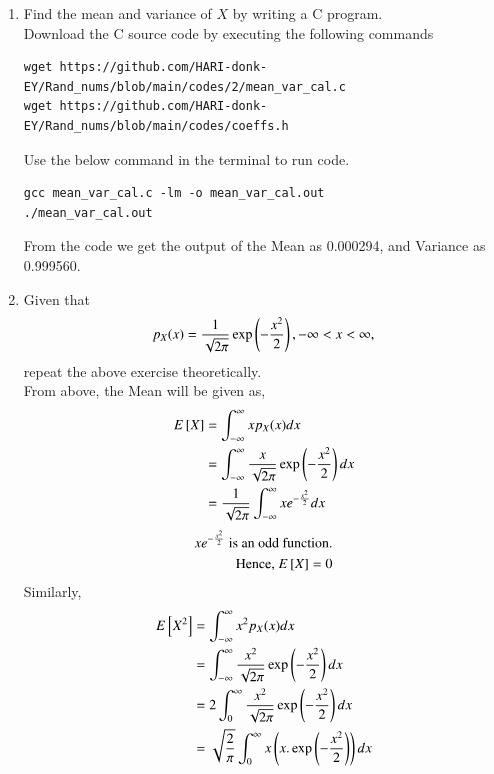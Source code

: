 \documentclass[journal,12pt,twocolumn]{IEEEtran}
\renewcommand\thesection{\arabic{section}}
\begin{document}
\begin{enumerate}[label=\thesection.\arabic*
,ref=\thesection.\theenumi]
\item Find the mean and variance of $X$ by writing a C program.\\

\solution Download the C source code by executing the following commands\\	
\begin{lstlisting}
wget https://github.com/HARI-donk-EY/Rand_nums/blob/main/codes/2/mean_var_cal.c
wget https://github.com/HARI-donk-EY/Rand_nums/blob/main/codes/coeffs.h
\end{lstlisting}

Use the below command in the terminal to run code.
\begin{lstlisting}
gcc mean_var_cal.c -lm -o mean_var_cal.out
./mean_var_cal.out
\end{lstlisting}

From the code we get the output of the Mean as 0.000294, and Variance as 0.999560.\\

\item Given that 
\begin{align}
p_{X}(x) = \frac{1}{\sqrt{2\pi}}\exp\left(-\frac{x^2}{2}\right), -\infty < x < \infty,
\end{align}
repeat the above exercise theoretically.\\
\solution From above, the Mean will be given as,
\begin{align}
	E{}\left[X\right] & = \int_{-\infty}^{\infty} x p_{X}(x) dx \\
	& = \int_{-\infty}^{\infty} \frac{x}{\sqrt{2\pi}}\exp\left(-\frac{x^2}{2}\right) dx \\
	& = \frac{1}{\sqrt{2\pi}}\int_{-\infty}^{\infty} x e^{-\frac{x^2}{2}} dx
\end{align}
\begin{align*}
	x e^{-\frac{x^2}{2}} \text{ is an odd function.}\\
	\text{Hence, }E{}\left[X\right] = 0\\
\end{align*}
Similarly,
\begin{align}
E{}\left[X^2\right] & = \int_{-\infty}^{\infty} x^2 p_{X}(x) dx \\
& = \int_{-\infty}^{\infty} \frac{x^2}{\sqrt{2\pi}}\exp\left(-\frac{x^2}{2}\right) dx \\
& = 2 \int_{0}^{\infty} \frac{x^2}{\sqrt{2\pi}}\exp\left(-\frac{x^2}{2}\right) dx \\
& = \sqrt{\frac{2}{\pi}} \int_{0}^{\infty} x \left(x. \exp\left(-\frac{x^2}{2}\right)\right) dx \\
\end{align}


\end{enumerate}
\end{document}
